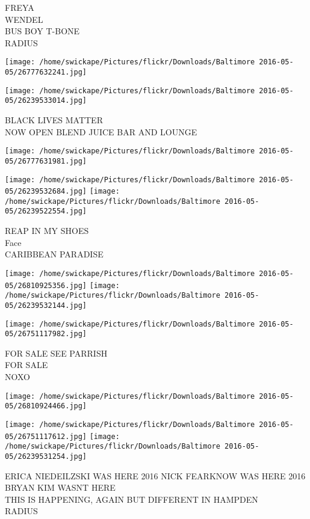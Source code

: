 \documentclass[10pt,letterpaper]{article}
\begin{document}
FREYA\\
WENDEL\\
BUS BOY T{-}BONE\\
RADIUS
\pagebreak

\texttt{[image: /home/swickape/Pictures/flickr/Downloads/Baltimore 2016-05-05/26777632241.jpg]}

\vspace{0.25in}
\texttt{[image: /home/swickape/Pictures/flickr/Downloads/Baltimore 2016-05-05/26239533014.jpg]}

BLACK LIVES MATTER\\
NOW OPEN BLEND JUICE BAR AND LOUNGE
\pagebreak

\texttt{[image: /home/swickape/Pictures/flickr/Downloads/Baltimore 2016-05-05/26777631981.jpg]}

\vspace{0.25in}
\texttt{[image: /home/swickape/Pictures/flickr/Downloads/Baltimore 2016-05-05/26239532684.jpg]}
\texttt{[image: /home/swickape/Pictures/flickr/Downloads/Baltimore 2016-05-05/26239522554.jpg]}

REAP IN MY SHOES\\
Face\\
CARIBBEAN PARADISE
\pagebreak

\texttt{[image: /home/swickape/Pictures/flickr/Downloads/Baltimore 2016-05-05/26810925356.jpg]}
\texttt{[image: /home/swickape/Pictures/flickr/Downloads/Baltimore 2016-05-05/26239532144.jpg]}

\texttt{[image: /home/swickape/Pictures/flickr/Downloads/Baltimore 2016-05-05/26751117982.jpg]}

FOR SALE SEE PARRISH\\
FOR SALE\\
NOXO
\pagebreak

\texttt{[image: /home/swickape/Pictures/flickr/Downloads/Baltimore 2016-05-05/26810924466.jpg]}

\vspace{0.25in}
\texttt{[image: /home/swickape/Pictures/flickr/Downloads/Baltimore 2016-05-05/26751117612.jpg]}
\texttt{[image: /home/swickape/Pictures/flickr/Downloads/Baltimore 2016-05-05/26239531254.jpg]}

ERICA NIEDEILZSKI WAS HERE 2016 NICK FEARKNOW WAS HERE 2016 BRYAN KIM WASNT HERE\\
THIS IS HAPPENING, AGAIN BUT DIFFERENT IN HAMPDEN\\
RADIUS
\pagebreak
\end{document}
